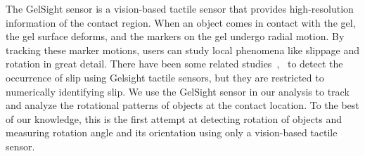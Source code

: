  




The GelSight sensor is a vision-based tactile sensor that provides high-resolution information of the contact region. 
 When an object comes in contact with the gel, the gel surface deforms, and the markers on the gel undergo radial motion. By tracking these marker motions, users can study local phenomena like slippage and rotation in great detail. 
There have been some related studies~\cite{shear-slip},~\cite{Improved_Gelsight} to detect the occurrence of slip using Gelsight tactile sensors, but they are restricted to numerically identifying slip. 
We use the GelSight sensor in our analysis to track and analyze the rotational patterns of objects at the contact location. To the best of our knowledge, this is the first attempt at detecting rotation of objects and measuring rotation angle and its orientation using only a vision-based tactile sensor. 
